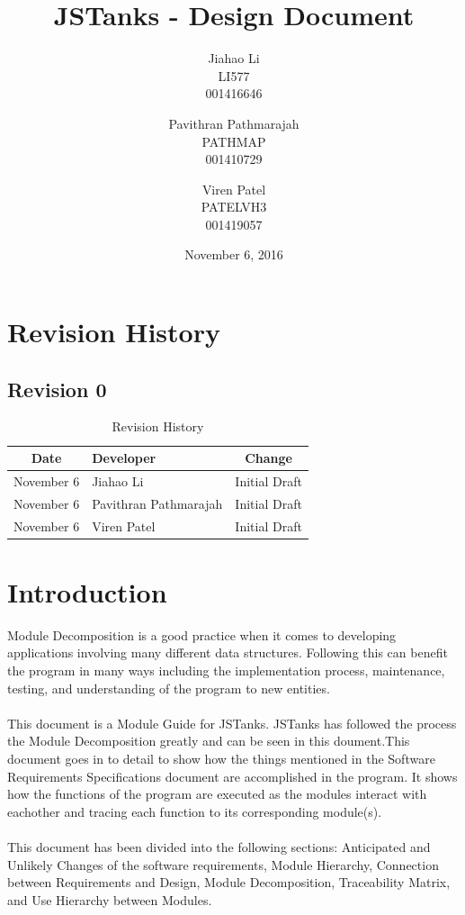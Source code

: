 \documentclass{article}
\begin{document}
\newpage
\title{JSTanks - Design Document}
\date{November 6, 2016}
\author{Jiahao Li\\LI577\\001416646\and Pavithran Pathmarajah\\PATHMAP\\
001410729 \and Viren Patel\\PATELVH3\\001419057}

\maketitle

\newpage
{}
\tableofcontents

\newpage
\section{Revision History}
\subsection{Revision 0}
\begin{table}[H]
\caption{Revision History}
	\begin{tabularx}{\textwidth}{cXc}
		\toprule
		Date & Developer & Change\\
		\midrule
		November 6&Jiahao Li &Initial Draft \\
		November 6&Pavithran Pathmarajah &Initial Draft\\
		November 6&Viren Patel  &Initial Draft\\
	\end{tabularx}
\end{table}

\section{Introduction}
Module Decomposition is a good practice when it comes to developing applications involving many different data structures. Following this can benefit the program in many ways including the implementation process, maintenance, testing, and understanding of the program to new entities.\\ \\
This document is a Module Guide for JSTanks. JSTanks has followed the process the Module Decomposition greatly and can be seen in this doument.This document goes in to detail to show how the things mentioned in the Software Requirements Specifications document are accomplished in the program. It shows how the functions of the program are executed as the modules interact with eachother and tracing each function to its corresponding module(s). \\ \\
This document has been divided into the following sections: Anticipated and Unlikely Changes of the software requirements, Module Hierarchy, Connection between Requirements and Design, Module Decomposition, Traceability Matrix, and Use Hierarchy between Modules.
\end{document}
